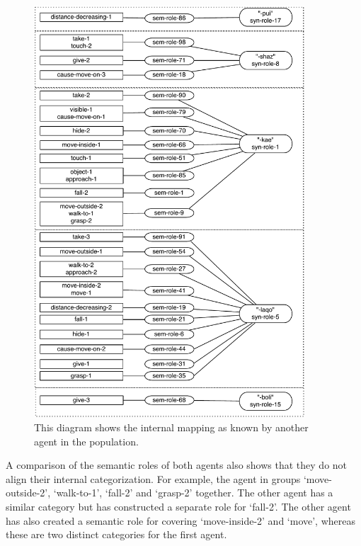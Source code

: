 \begin{figure}[p]
\centerline{\includegraphics[width=0.9\textwidth]{Chapter4/figs/multi-agent2}}
  \caption[Syntactic roles: the mapping for a single agent (2)]{This diagram shows the internal mapping as known by another agent in the population.}
   \label{f:multi-agent2}
\end{figure}

A comparison of the semantic roles of both agents also shows that they do not align their internal categorization. For example, the agent in  groups `move-outside-2', `walk-to-1', `fall-2' and `grasp-2' together. The other agent has a similar category but has constructed a separate role for `fall-2'. The other agent has also created a semantic role for covering `move-inside-2' and `move', whereas these are two distinct categories for the first agent.


